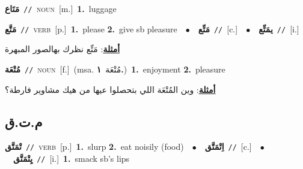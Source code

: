 \documentclass[10pt,a4paper,twoside]{article} %
\begin{document}
\begin{multicols}{2}
{\setlength\topsep{0pt}\textbf{\foreignlanguage{arabic}{مَتَاع}}\ {\color{gray}\texttt{//}\color{black}}\ \textsc{noun}\ [m.]\ \textbf{1.}~luggage\ } \vspace{2mm}

{\setlength\topsep{0pt}\textbf{\foreignlanguage{arabic}{مَتَّع}}\ {\color{gray}\texttt{//}\color{black}}\ \textsc{verb}\ [p.]\ \textbf{1.}~please  \textbf{2.}~give sb pleasure\ \ $\bullet$\ \ \setlength\topsep{0pt}\textbf{\foreignlanguage{arabic}{مَتِّع}}\ {\color{gray}\texttt{//}\color{black}}\ [c.]\ \ $\bullet$\ \ \setlength\topsep{0pt}\textbf{\foreignlanguage{arabic}{يمَتِّع}}\ {\color{gray}\texttt{//}\color{black}}\ [i.]\  \begin{flushright}\color{gray}\foreignlanguage{arabic}{\textbf{\underline{\foreignlanguage{arabic}{أمثلة}}}: مَتِّع نظرك بهالصور المبهرة}\end{flushright}\color{black}} \vspace{2mm}

{\setlength\topsep{0pt}\textbf{\foreignlanguage{arabic}{مُتْعَة}}\ {\color{gray}\texttt{//}\color{black}}\ \textsc{noun}\ [f.]\ \color{gray}(msa. \foreignlanguage{arabic}{مُتْعَة}~\foreignlanguage{arabic}{\textbf{١.}})\color{black}\ \textbf{1.}~enjoyment  \textbf{2.}~pleasure\  \begin{flushright}\color{gray}\foreignlanguage{arabic}{\textbf{\underline{\foreignlanguage{arabic}{أمثلة}}}: وين المُتْعَة اللي بتحصلوا عيها من هيك مشاوير فارطة؟}\end{flushright}\color{black}} \vspace{2mm}

\vspace{-3mm}
\subsection*{\color{blue}\foreignlanguage{arabic}{م.ت.ق}\color{blue}{}} 

{\setlength\topsep{0pt}\textbf{\foreignlanguage{arabic}{تْمَتَّق}}\ {\color{gray}\texttt{//}\color{black}}\ \textsc{verb}\ [p.]\ \textbf{1.}~slurp  \textbf{2.}~eat noisily (food)\ \ $\bullet$\ \ \setlength\topsep{0pt}\textbf{\foreignlanguage{arabic}{اِتْمَتَّق}}\ {\color{gray}\texttt{//}\color{black}}\ [c.]\ \ $\bullet$\ \ \setlength\topsep{0pt}\textbf{\foreignlanguage{arabic}{يِتْمَتَّق}}\ {\color{gray}\texttt{//}\color{black}}\ [i.]\ \textbf{1.}~smack sb's lips\ } \vspace{2mm}


\end{multicols}
\end{document}
